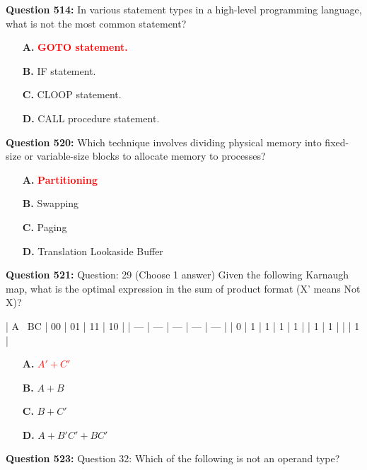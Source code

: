 \documentclass[12pt,a4paper]{article}
\begin{document}
\vspace{0.5cm}

\textbf{Question 514:} In various statement types in a high-level programming language, what is not the most common statement?

\begin{itemize}
    \item[\textbf{A.}] \textcolor{red}{\textbf{GOTO statement.}}
    \item[\textbf{B.}] IF statement.
    \item[\textbf{C.}] CLOOP statement.
    \item[\textbf{D.}] CALL procedure statement.
\end{itemize}

\vspace{0.5cm}

\textbf{Question 520:} Which technique involves dividing physical memory into fixed-size or variable-size blocks to allocate memory to processes?

\begin{itemize}
    \item[\textbf{A.}] \textcolor{red}{\textbf{Partitioning}}
    \item[\textbf{B.}] Swapping
    \item[\textbf{C.}] Paging
    \item[\textbf{D.}] Translation Lookaside Buffer
\end{itemize}

\vspace{0.5cm}

\textbf{Question 521:} Question: 29 (Choose 1 answer) Given the following Karnaugh map, what is the optimal expression in the sum of product format (X' means Not X)?

| A \ BC | 00 | 01 | 11 | 10 |
| --- | --- | --- | --- | --- |
| 0 | 1 | 1 | 1 | 1 |
| 1 | 1 | | | 1 |

\begin{itemize}
    \item[\textbf{A.}] \textcolor{red}{\textbf{$A' + C'$}}
    \item[\textbf{B.}] $A + B$
    \item[\textbf{C.}] $B + C'$
    \item[\textbf{D.}] $A + B'C' + BC'$
\end{itemize}

\vspace{0.5cm}

\textbf{Question 523:} Question 32: Which of the following is not an operand type?
\end{document}
